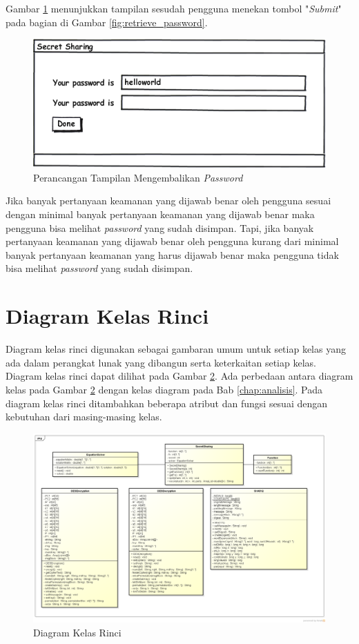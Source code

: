 Gambar \ref{fig:password} menunjukkan tampilan sesudah pengguna menekan tombol "\textit{Submit}" pada bagian di Gambar \ref{fig:retrieve_password}.

\begin{figure}[H]
	\centerline{\includegraphics[scale=0.5]{Gambar/password}}
	\caption{Perancangan Tampilan Mengembalikan \textit{Password}}\label{fig:password}
\end{figure}

Jika banyak pertanyaan keamanan yang dijawab benar oleh pengguna sesuai dengan minimal banyak pertanyaan keamanan yang dijawab benar maka pengguna bisa melihat \textit{password} yang sudah disimpan. Tapi, jika banyak pertanyaan keamanan yang dijawab benar oleh pengguna kurang dari minimal banyak pertanyaan keamanan yang harus dijawab benar maka pengguna tidak bisa melihat \textit{password} yang sudah disimpan.

\section{Diagram Kelas Rinci}

Diagram kelas rinci digunakan sebagai gambaran umum untuk setiap kelas yang ada dalam perangkat lunak yang dibangun serta keterkaitan setiap kelas. Diagram kelas rinci dapat dilihat pada Gambar \ref{fig:final_class_diagram}. Ada perbedaan antara diagram kelas pada Gambar \ref{fig:final_class_diagram} dengan kelas diagram pada Bab \ref{chap:analisis}. Pada diagram kelas rinci ditambahkan beberapa atribut dan fungsi sesuai dengan kebutuhan dari masing-masing kelas.

\begin{figure}
	\centerline{\includegraphics[scale=0.5]{Gambar/final_class_diagram}}
	\caption{Diagram Kelas Rinci}\label{fig:final_class_diagram}
\end{figure}

